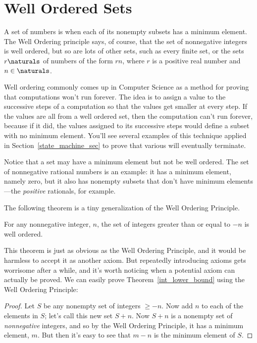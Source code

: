 \section{Well Ordered Sets}\label{well_ordering_sec}

A set of numbers is  when each of its nonempty
subsets has a minimum element.  The Well Ordering principle says, of
course, that the set of nonnegative integers is well ordered, but so
are lots of other sets, such as every finite set, or the sets
$r\naturals$ of numbers of the form $rn$, where $r$ is a positive real
number and $n \in \naturals$.

Well ordering commonly comes up in Computer Science as a method for
proving that computations won't run forever.  The idea is to assign a
value to the successive steps of a computation so that the values get
smaller at every step.  If the values are all from a well ordered set,
then the computation can't run forever, because if it did, the values
assigned to its successive steps would define a subset with no minimum
element.  You'll see several examples of this technique applied in
Section~\ref{state_machine_sec} to prove that various  will eventually terminate.

Notice that a set may have a minimum element but not be well ordered.
The set of nonnegative rational numbers is an example: it has a
minimum element, namely zero, but it also has nonempty subsets that
don't have minimum elements---the \emph{positive} rationals, for
example.

The following theorem is a tiny generalization of the Well Ordering
Principle.

\begin{theorem}\label{int_lower_bound}
For any nonnegative integer, $n$, the set of integers greater than or equal to $-n$
is well ordered.
\end{theorem}

This theorem is just as obvious as the Well Ordering Principle, and it
would be harmless to accept it as another axiom.  But repeatedly
introducing axioms gets worrisome after a while, and it's worth
noticing when a potential axiom can actually be proved.  We can easily
prove Theorem~\ref{int_lower_bound} using the Well Ordering Principle:

\begin{proof}
Let $S$ be any nonempty set of integers $\geq -n$.  Now add $n$ to
each of the elements in $S$; let's call this new set $S+n$.  Now $S+n$
is a nonempty set of \emph{nonnegative} integers, and so by the Well
Ordering Principle, it has a minimum element, $m$.  But then it's easy
to see that $m - n$ is the minimum element of $S$.
\end{proof}

